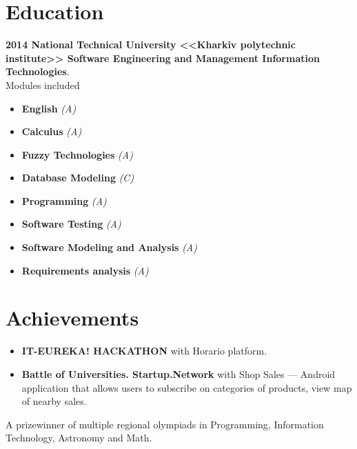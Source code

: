 \documentclass[a4paper]{article}
\begin{document}
	\section*{Education}
	\textbf{2014 National Technical University <<Kharkiv polytechnic institute>> Software Engineering and Management Information Technologies}. \\
	Modules included 
	\begin{multicols}{2}
	\begin{itemize}
		\item \textbf{English} \textit{(A)}
		\item \textbf{Calculus} \textit{(A)}
		\item \textbf{Fuzzy Technologies} \textit{(A)}
		\item \textbf{Database Modeling} \textit{(C)}
		\item \textbf{Programming} \textit{(A)}
		\item \textbf{Software Testing} \textit{(A)}
		\item \textbf{Software Modeling and Analysis} \textit{(A)}
		\item \textbf{Requirements analysis} \textit{(A)}
	\end{itemize}
	\end{multicols}

	\section*{Achievements}
	\begin{itemize}
		\item \textbf{IT-EUREKA! HACKATHON} with Horario platform.
		\item \textbf{Battle of Universities. Startup.Network} with Shop Sales --- Android application that allows users to subscribe on categories of products, view map of nearby sales.
	\end{itemize}
	A prizewinner of multiple regional olympiads in Programming, Information Technology, Astronomy and Math. 
\end{document}
